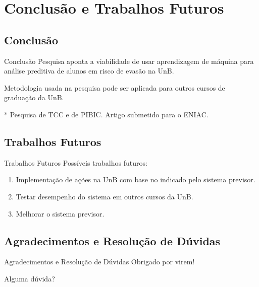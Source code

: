 \section{Conclusão e Trabalhos Futuros}
\subsection{Conclusão}
\begin{frame}{Conclusão}
    Pesquisa aponta a viabilidade de usar aprendizagem de máquina para análise
    preditiva de alunos em risco de evasão na UnB. 

    \vspace{0.5cm}

    Metodologia usada na pesquisa pode ser aplicada para outros cursos de graduação
    da UnB. 

    \vspace{0.5cm}

    * Pesquisa de TCC e de PIBIC. Artigo submetido para o ENIAC. 
\end{frame}

\subsection{Trabalhos Futuros}
\begin{frame}{Trabalhos Futuros}
    Possíveis trabalhos futuros: 
    \begin{enumerate}
        \item Implementação de ações na UnB com base no indicado pelo sistema
            previsor. 
        \item Testar desempenho do sistema em outros cursos da UnB. 
        \item Melhorar o sistema previsor.
    \end{enumerate}
\end{frame}

\subsection{Agradecimentos e Resolução de Dúvidas}
\begin{frame}{Agradecimentos e Resolução de Dúvidas}
    Obrigado por virem!

    \vspace{0.5cm}

    Alguma dúvida?
\end{frame}
